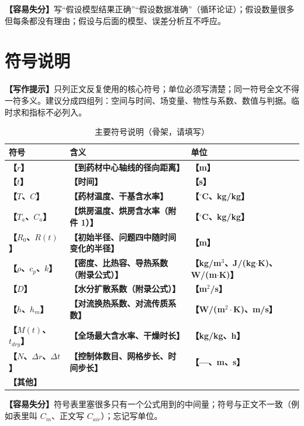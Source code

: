\documentclass[12pt,a4paper]{article}
\newcommand{\prompt}[1]{\par\noindent\textbf{【写作提示】}#1\par}      %
\newcommand{\pitfall}[1]{\par\noindent\textbf{【容易失分】}#1\par}     %
\newcommand{\ph}[1]{\textbf{【#1】}}                                   %
\begin{document}
\pitfall{写“假设模型结果正确”“假设数据准确”（循环论证）；假设数量很多但每条都没有理由；假设与后面的模型、误差分析互不呼应。}

\clearpage

\section{符号说明}

\prompt{只列正文反复使用的核心符号；单位必须写清楚；同一符号全文不得一符多义。建议分成四组列：空间与时间、场变量、物性与系数、数值与判据。临时求和指标不必列入。}

\begin{table}[H]
\centering
\caption{主要符号说明（骨架，请填写）}
\label{tab:symbol}
\begin{tabular}{p{2.4cm}p{9.0cm}p{2.6cm}}
\toprule
符号 & 含义 & 单位\\
\midrule
\ph{$r$} & \ph{到药材中心轴线的径向距离} & \ph{m}\\
\ph{$t$} & \ph{时间} & \ph{s}\\
\ph{$T$、$C$} & \ph{药材温度、干基含水率} & \ph{$^\circ$C、kg/kg}\\
\ph{$T_a$、$C_a$} & \ph{烘房温度、烘房含水率（附件 1）} & \ph{$^\circ$C、kg/kg}\\
\ph{$R_0$、$R(t)$} & \ph{初始半径、问题四中随时间变化的半径} & \ph{m}\\
\ph{$\rho$、$c_p$、$k$} & \ph{密度、比热容、导热系数（附录公式）} & \ph{kg/m$^3$、J/(kg$\cdot$K)、W/(m$\cdot$K)}\\
\ph{$D$} & \ph{水分扩散系数（附录公式）} & \ph{m$^2$/s}\\
\ph{$h$、$h_m$} & \ph{对流换热系数、对流传质系数} & \ph{W/(m$^2\cdot$K)、m/s}\\
\ph{$M(t)$、$t_{dry}$} & \ph{全场最大含水率、干燥时长} & \ph{kg/kg、h}\\
\ph{$N$、$\Delta r$、$\Delta t$} & \ph{控制体数目、网格步长、时间步长} & \ph{---、m、s}\\
\ph{其他} & & \\
\bottomrule
\end{tabular}
\end{table}

\pitfall{符号表里塞很多只有一个公式用到的中间量；符号与正文不一致（例如表里叫 $C_m$、正文写 $C_{air}$）；忘记写单位。}

\clearpage
\end{document}
